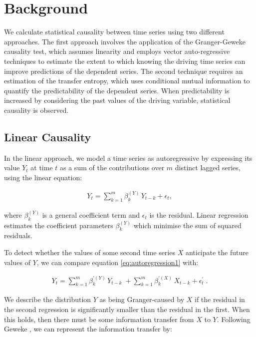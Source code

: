 \documentclass[]{rsos}%
\begin{document}
\section{Background} \label{s.background}  

  We calculate statistical causality between time series using two different approaches. The first approach involves the application of the Granger-Geweke causality test, which assumes linearity and employs vector auto-regressive techniques to estimate the extent to which knowing the driving time series can improve predictions of the dependent series. The second technique requires an estimation of the transfer entropy, which uses conditional mutual information to quantify the predictability of the dependent series. When predictability is increased by considering the past values of the driving variable, statistical causality is observed.
  
  \subsection{Linear Causality}
  
  In the linear approach, we model a time series as autoregressive by expressing its value $Y_t$ at time $t$ as a sum of the contributions over $m$ distinct lagged series, using the linear equation:

  \begin{eqnarray}
    \label{eq:autoregression1}
    Y_t = \sum_{k=1}^m \beta_{k}^{(Y)} \, Y_{t-k} + \epsilon_t ,
  \end{eqnarray}

  where $\beta^{(Y)}_k$ is a general coefficient term and $\epsilon_t$ is the residual. Linear regression estimates the coefficient parameters $\beta^{(Y)}_k$ which minimise the sum of squared residuals. 

  To detect whether the values of some second time series $X$ anticipate the future values of $Y$, we can compare equation \ref{eq:autoregression1}  with: 

  \begin{eqnarray}
    \label{eq:autoregression2}
  Y_t = \sum_{k=1}^m \beta_{k}^{\prime(Y)} \, Y_{t-k}  \; + 
        \sum_{k=1}^m \beta_{k}^{\prime(X)} \, X_{t-k} 
  + \epsilon^{\prime}_t \;.
  \end{eqnarray}

We describe the distribution $Y$ as being Granger-caused by $X$ if the residual in the second regression is significantly smaller than the residual in the first. When this holds, then there must be some information transfer from $X$ to $Y$. Following Geweke \cite{geweke1984measures}, we can represent the information transfer by:
\end{document}
